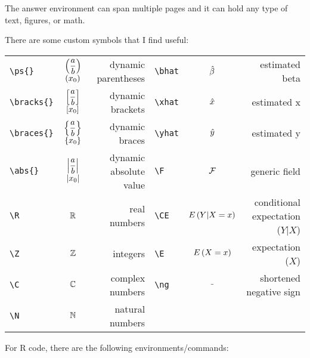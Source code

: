 \documentclass{gerot-assignment}
\begin{document}
\begin{answer}
    The answer environment can span multiple pages and it can hold any type of text, figures, or math.
    
    \vspace*{2em}
    
    There are some custom symbols that I find useful:
    
    \begin{tabular}{lcr|lcr}
        \verb|\ps{}| & $\displaystyle\left(\frac{a}{b}\right)$ $\left(x_0\right)$ & dynamic parentheses
        &\verb|\bhat| & $\hat{\beta}$ & estimated beta\\[6pt]
        \verb|\bracks{}| & $\displaystyle\left[\frac{a}{b}\right]$ $\left[x_0\right]$ & dynamic brackets
        &\verb|\xhat| & $\hat{x}$ & estimated x\\[6pt]
        \verb|\braces{}| & $\displaystyle\left\{\frac{a}{b}\right\}$ $\left\{x_0\right\}$ & dynamic braces
        &\verb|\yhat| & $\hat{y}$ & estimated y\\[6pt]
        \verb|\abs{}| & $\displaystyle\left|\frac{a}{b}\right|$ $\left|x_0\right|$ & dynamic absolute value
        &\verb|\F| & $\mathcal{F}$ & generic field\\
        \verb|\R| & $\mathbb{R}$ & real numbers
        &\verb|\CE| & $E\left(Y|X=x\right)$ & conditional expectation ($Y|X$)\\
        \verb|\Z| & $\mathbb{Z}$ & integers
        &\verb|\E| & $E\left(X=x\right)$ & expectation ($X$)\\
        \verb|\C| & $\mathbb{C}$ & complex numbers
        &\verb|\ng| & $\ng$ & shortened negative sign\\
        \verb|\N| & $\mathbb{N}$ & natural numbers\\
    \end{tabular}
    
    \vspace*{2em}
    
    For R code, there are the following environments/commands:
    

\end{answer}
\end{document}

